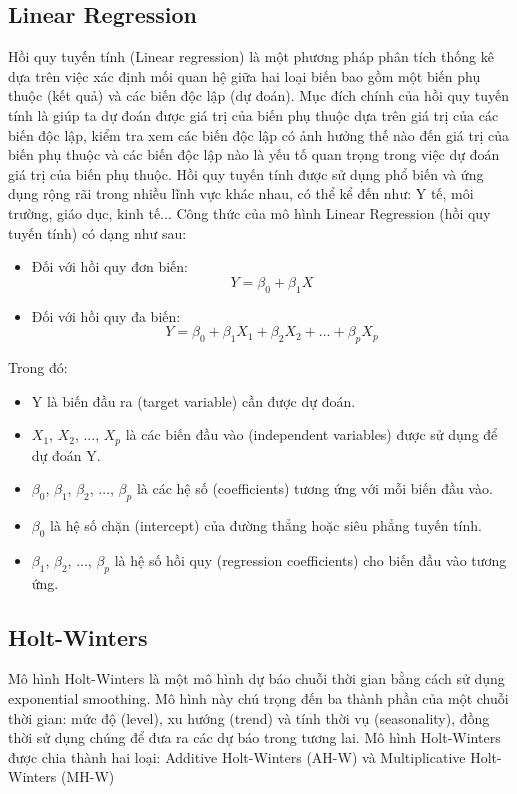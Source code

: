 \documentclass{ieeeojies}
\begin{document}
\subsection{Linear Regression}
Hồi quy tuyến tính (Linear regression) là một phương pháp phân tích thống kê dựa trên việc xác định mối quan hệ giữa hai loại biến bao gồm một biến phụ thuộc (kết quả) và các biến độc lập (dự đoán). Mục đích chính của hồi quy tuyến tính là giúp ta dự đoán được giá trị của biến phụ thuộc dựa trên giá trị của các biến độc lập, kiểm tra xem các biến độc lập có ảnh hưởng thế nào đến giá trị của biến phụ thuộc và các biến độc lập nào là yếu tố quan trọng trong việc dự đoán giá trị của biến phụ thuộc. Hồi quy tuyến tính được sử dụng phổ biến và ứng dụng rộng rãi trong nhiều lĩnh vực khác nhau, có thể kể đến như: Y tế, môi trường, giáo dục, kinh tế...
Công thức của mô hình Linear Regression (hồi quy tuyến tính) có dạng như sau:
\begin{itemize}
    \item Đối với hồi quy đơn biến: 
    \begin{equation}
 Y = \beta_{0}+ \beta_{1}X
    \end{equation}
    \item Đối với hồi quy đa biến: 
    \begin{equation}
  Y = \beta_{0} + \beta_{1}X_{1} + \beta_{2}X_{2} + ... + \beta_{p}X_{p}      
    \end{equation}  
\end{itemize}
Trong đó:
\begin{itemize}
    \item Y là biến đầu ra (target variable) cần được dự đoán.
    \item  \(X_{1}\), \(X_{2}\), ..., \(X_{p}\) là các biến đầu vào (independent variables) được sử dụng để dự đoán Y.
    \item \(\beta_{0}\), \(\beta_{1}\), \(\beta_{2}\), ..., \(\beta_{p}\) là các hệ số (coefficients) tương ứng với mỗi biến đầu vào.
    \item \(\beta_{0}\) là hệ số chặn (intercept) của đường thẳng hoặc siêu phẳng tuyến tính.
    \item \(\beta_{1}\), \(\beta_{2}\), ..., \(\beta_{p}\) là hệ số hồi quy (regression coefficients) cho biến đầu vào tương ứng.
\end{itemize}

\subsection{Holt-Winters}
Mô hình Holt-Winters là một mô hình dự báo chuỗi thời gian bằng cách sử dụng exponential smoothing. Mô hình này chú trọng đến ba thành phần của một chuỗi thời gian: mức độ (level), xu hướng (trend) và tính thời vụ (seasonality), đồng thời sử dụng chúng để đưa ra các dự báo trong tương lai.
Mô hình Holt-Winters được chia thành hai loại: Additive Holt-Winters (AH-W) và Multiplicative Holt-Winters (MH-W)
\end{document}
